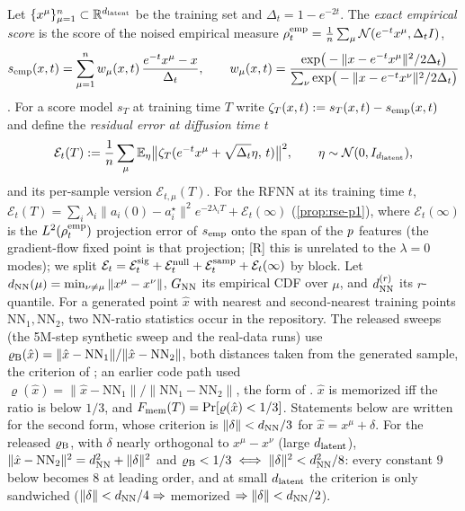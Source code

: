 \begin{definition}\label{def:bridge-objects}
Let $\{x^\mu\}_{\mu=1}^{n}\subset\mathbb{R}^{d_{\mathrm{latent}}}$ be the training set and $\Delta_t=1-e^{-2t}$. The \emph{exact empirical score} is the score of the noised empirical measure $\rho^{\rm emp}_t=\frac1{n}\sum_\mu\mathcal N(e^{-t}x^\mu,\Delta_t I)$,
\begin{equation}\label{eq:semp}
 s_{\rm emp}(x,t)=\sum_{\mu=1}^{n} w_\mu(x,t)\,\frac{e^{-t}x^\mu-x}{\Delta_t},\qquad w_\mu(x,t)=\frac{\exp\!\big(-\|x-e^{-t}x^\mu\|^2/2\Delta_t\big)}{\sum_\nu \exp\!\big(-\|x-e^{-t}x^\nu\|^2/2\Delta_t\big)}
\end{equation}
\citep{scarvelis2023closedform,gu2023memorization}. For a score model $s_T$ at training time $T$ write $\zeta_T(x,t):=s_T(x,t)-s_{\rm emp}(x,t)$ and define the \emph{residual error at diffusion time $t$}
\begin{equation}\label{eq:ET}
 \mathcal E_t(T):=\frac1{n}\sum_{\mu}\mathbb{E}_{\eta}\big\|\zeta_T(e^{-t}x^\mu+\sqrt{\Delta_t}\eta,\,t)\big\|^2,\qquad \eta\sim\mathcal N(0,I_{d_{\mathrm{latent}}}),
\end{equation}
and its per-sample version $\mathcal E_{t,\mu}(T)$. For the RFNN at its training time $t$, $\mathcal E_t(T)=\sum_i\lambda_i\|a_i(0)-a_i^\star\|^2e^{-2\lambda_iT}+\mathcal E_t(\infty)$ (\cref{prop:rse-p1}), where $\mathcal E_t(\infty)$ is the $L^2(\rho^{\rm emp}_t)$ projection error of $s_{\rm emp}$ onto the span of the $p$ features (the gradient-flow fixed point is that projection; [R] this is unrelated to the $\lambda=0$ modes); we split $\mathcal E_t=\mathcal E^{\rm sig}_t+\mathcal E^{\rm null}_t+\mathcal E^{\rm samp}_t+\mathcal E_t(\infty)$ by block. Let $d_{\rm NN}(\mu)=\min_{\nu\neq\mu}\|x^\mu-x^\nu\|$, $G_{\rm NN}$ its empirical CDF over $\mu$, and $d_{\rm NN}^{(r)}$ its $r$-quantile. For a generated point $\hat x$ with nearest and second-nearest training points $\mathrm{NN}_1,\mathrm{NN}_2$, two NN-ratio statistics occur in the repository. The released sweeps (the 5M-step synthetic sweep and the real-data runs) use $\varrho_{\rm B}(\hat x)=\|\hat x-\mathrm{NN}_1\|/\|\hat x-\mathrm{NN}_2\|$, both distances taken from the generated sample, the criterion of \citet{bonnaire2025}; an earlier code path used $\varrho(\hat x)=\|\hat x-\mathrm{NN}_1\|/\|\mathrm{NN}_1-\mathrm{NN}_2\|$, the form of \citet{somepalli2023diffusion}. $\hat x$ is memorized iff the ratio is below $1/3$, and $F_{\rm mem}(T)=\Pr[\varrho(\hat x)<1/3]$. Statements below are written for the second form, whose criterion is $\|\delta\|<d_{\rm NN}/3$ for $\hat x=x^\mu+\delta$. For the released $\varrho_{\rm B}$, with $\delta$ nearly orthogonal to $x^\mu-x^\nu$ (large $d_{\mathrm{latent}}$), $\|\hat x-\mathrm{NN}_2\|^2=d_{\rm NN}^2+\|\delta\|^2$ and $\varrho_{\rm B}<1/3\iff\|\delta\|^2<d_{\rm NN}^2/8$: every constant $9$ below becomes $8$ at leading order, and at small $d_{\mathrm{latent}}$ the criterion is only sandwiched ($\|\delta\|<d_{\rm NN}/4\Rightarrow$ memorized $\Rightarrow\|\delta\|<d_{\rm NN}/2$).
\end{definition}

